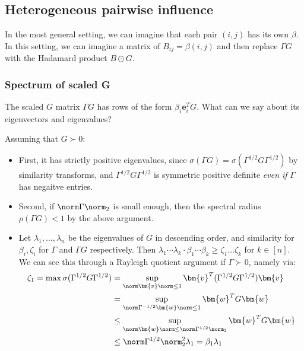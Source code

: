 \subsection{Heterogeneous pairwise influence}

In the most general setting, we can imagine that each pair $(i, j)$ has its own $\beta$. In this setting, we can imagine a matrix of $B_{ij} = \beta(i, j)$ and then replace $\Gamma G$ with the Hadamard product $B \odot G$. 

\subsubsection{Spectrum of scaled G}

The scaled $G$ matrix $\Gamma G$ has rows of the form $\beta_i \bm{e}_i^T G$. 
What can we say about its eigenvectors and eigenvalues? 

Assuming that $G \succ 0$: 

\begin{itemize}
    \item First, it has strictly positive eigenvalues, since $\sigma(\Gamma G) = \sigma(\Gamma^{1/2} G \Gamma^{1/2})$ by similarity transforms, and $\Gamma^{1/2} G \Gamma^{1/2}$ is symmetric positive definite {\em even if} $\Gamma$ has negaitve entries. 
    \item Second, if $\norm \Gamma \norm_2$ is small enough, then the spectral radius $\rho(\Gamma G) < 1$ by the above argument. 
    \item Let $\lambda_1, \dots, \lambda_n$ be the eigenvalues of $G$ in descending order, and similarity for $\beta_i, \zeta_i$ for $\Gamma$ and $\Gamma G$ respectively. Then $\lambda_1 \cdots \lambda_k \cdot \beta_1 \cdots \beta_k \geq \zeta_1 \dots \zeta_k$ for $k \in [n]$. We can see this through a Rayleigh quotient argument if $\Gamma \succ 0$, namely via: 
    \begin{align*}
    \zeta_1 = \max\sigma(\Gamma^{1/2} G \Gamma^{1/2}) &= \sup_{\norm \bm{v} \norm \leq 1} \bm{v}^T (\Gamma^{1/2} G \Gamma^{1/2}) \bm{v} \\
    &= \sup_{\norm \Gamma^{-1/2} \bm{w} \norm \leq 1} \bm{w}^T G \bm{w} \\
    &\leq \sup_{\norm \bm{w} \norm \leq \norm \Gamma^{1/2} \norm_2} \bm{w}^T G \bm{w} \\
    &\leq \norm \Gamma^{1/2}\norm_2^2 \lambda_1 = \beta_1 \lambda_1
    \end{align*}
\end{itemize}

